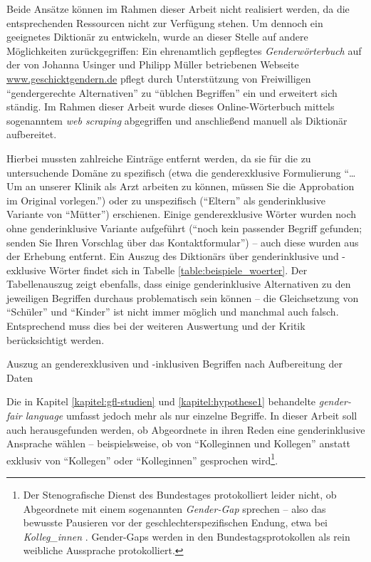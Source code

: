 \documentclass[12pt, 
    twoside=false, 
    bibliography=totoc, 
    numbers=endperiod, 
    headings=normal, 
    toc=chapterentrydotfill
    ]{scrbook}
\begin{document}
Beide Ansätze können im Rahmen dieser Arbeit nicht realisiert werden, da die entsprechenden Ressourcen nicht zur Verfügung stehen. Um dennoch ein geeignetes Diktionär zu entwickeln, wurde an dieser Stelle auf andere Möglichkeiten zurückgegriffen:
Ein ehrenamtlich gepflegtes \emph{Genderwörterbuch} auf der von Johanna Usinger und Philipp Müller betriebenen Webseite \url{www.geschicktgendern.de} pflegt durch Unterstützung von Freiwilligen \enquote{gendergerechte Alternativen} zu \enquote{üblchen Begriffen} ein und erweitert sich ständig. Im Rahmen dieser Arbeit wurde dieses Online-Wörterbuch mittels sogenanntem \emph{web scraping} \parencite{wickham_2016} abgegriffen und anschließend manuell als Diktionär aufbereitet. 

Hierbei mussten zahlreiche Einträge entfernt werden, da sie für die zu untersuchende Domäne zu spezifisch (etwa die genderexklusive Formulierung \enquote{… Um an unserer Klinik als Arzt arbeiten zu können, müssen Sie die Approbation im Original vorlegen.}) oder zu unspezifisch (\enquote{Eltern} als genderinklusive Variante von \enquote{Mütter}) erschienen. Einige genderexklusive Wörter wurden noch ohne genderinklusive Variante aufgeführt (\enquote{noch kein passender Begriff gefunden; senden Sie Ihren Vorschlag über das Kontaktformular}) -- auch diese wurden aus der Erhebung entfernt. Ein Auszug des Diktionärs über genderinklusive und -exklusive Wörter findet sich in Tabelle \ref{table:beispiele_woerter}. Der Tabellenauszug zeigt ebenfalls, dass einige genderinklusive Alternativen zu den jeweiligen Begriffen durchaus problematisch sein können -- die Gleichsetzung von \enquote{Schüler} und \enquote{Kinder} ist nicht immer möglich und manchmal auch falsch. Entsprechend muss dies bei der weiteren Auswertung und der Kritik berücksichtigt werden.


\begin{table}[htb]
    \centering
    \caption[Auszug an genderexklusiven und -inklusiven Begriffen nach Aufbereitung der Daten]{Auszug an genderexklusiven und -inklusiven Begriffen nach Aufbereitung der Daten}
    
    \label{table:beispiele_woerter}
\end{table}

Die in Kapitel \ref{kapitel:gfl-studien} und \ref{kapitel:hypothese1} behandelte \emph{gender-fair language} umfasst jedoch mehr als nur einzelne Begriffe. In dieser Arbeit soll auch herausgefunden werden, ob Abgeordnete in ihren Reden eine genderinklusive Ansprache wählen -- beispielsweise, ob von \enquote{Kolleginnen und Kollegen} anstatt exklusiv von \enquote{Kollegen} oder \enquote{Kolleginnen} gesprochen wird\footnote{Der Stenografische Dienst des Bundestages protokolliert leider nicht, ob Abgeordnete mit einem sogenannten \emph{Gender-Gap} sprechen -- also das bewusste Pausieren vor der geschlechterspezifischen Endung, etwa bei \emph{Kolleg\_innen} \parencite[vgl.][]{reisigl_2017}. Gender-Gaps werden in den Bundestagsprotokollen als rein weibliche Aussprache protokolliert.}. 
\end{document}
